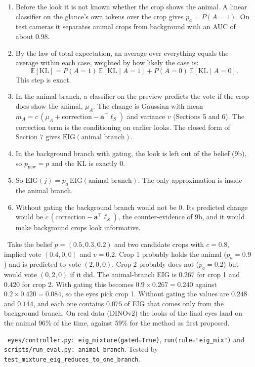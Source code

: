 \documentclass[11pt]{article}
\newcommand{\EIG}{\mathrm{EIG}}
\newcommand{\KL}{\mathrm{KL}}
\newcommand{\Steps}{\par\smallskip\noindent{\sffamily\bfseries\color{headblue}Steps.}\par}
\newcommand{\CheckNum}{\par\smallskip\noindent{\sffamily\bfseries\color{headblue}Check with numbers.}\ }
\newcommand{\Code}{\par\smallskip\noindent{\sffamily\bfseries\color{headblue}In the code.}\ }
\newenvironment{steps}{\begin{enumerate}[label=\textbf{\arabic*.},leftmargin=2em,itemsep=6pt]}{\end{enumerate}}
\begin{document}
\Steps
\begin{steps}
  \item Before the look it is not known whether the crop shows the animal. A linear classifier on the glance's own tokens over the crop gives $p_a=P(A=1)$. On test cameras it separates animal crops from background with an AUC of about 0.98.
  \item By the law of total expectation, an average over everything equals the average within each case, weighted by how likely the case is:
  \[ \mathbb E[\KL]=P(A{=}1)\,\mathbb E[\KL\mid A{=}1]+P(A{=}0)\,\mathbb E[\KL\mid A{=}0]. \]
  This step is exact.
  \item In the animal branch, a classifier on the preview predicts the vote if the crop does show the animal, $\mu_A$. The change is Gaussian with mean $m_A=c\,(\mu_A+\text{correction}-\bm a^\top\bm\ell_S)$ and variance $v$ (Sections 5 and 6). The correction term is the conditioning on earlier looks. The closed form of Section 7 gives $\EIG(\text{animal branch})$.
  \item In the background branch with gating, the look is left out of the belief (9b), so $p_{\text{new}}=p$ and the KL is exactly 0.
  \item So $\EIG(j)=p_a\,\EIG(\text{animal branch})$. The only approximation is inside the animal branch.
  \item Without gating the background branch would not be 0. Its predicted change would be $c\,(\text{correction}-\bm a^\top\bm\ell_S)$, the counter-evidence of 9b, and it would make background crops look informative.
\end{steps}

\CheckNum Take the belief $p=(0.5,0.3,0.2)$ and two candidate crops with $c=0.8$, implied vote $(0.4,0,0)$ and $v=0.2$. Crop 1 probably holds the animal ($p_a=0.9$) and is predicted to vote $(2,0,0)$. Crop 2 probably does not ($p_a=0.2$) but would vote $(0,2,0)$ if it did. The animal-branch EIG is $0.267$ for crop 1 and $0.420$ for crop 2. With gating this becomes $0.9\times0.267=0.240$ against $0.2\times0.420=0.084$, so the eyes pick crop 1. Without gating the values are $0.248$ and $0.144$, and each one contains $0.075$ of EIG that comes only from the background branch. On real data (DINOv2) the looks of the final eyes land on the animal 96\% of the time, against 59\% for the method as first proposed.

\Code \texttt{eyes/controller.py: eig\_\allowbreak{}mixture(gated=True)}, \texttt{run(rule="eig\_\allowbreak{}mix")} and \texttt{scripts/run\_\allowbreak{}eval.py: animal\_\allowbreak{}branch}. Tested by \texttt{test\_\allowbreak{}mixture\_\allowbreak{}eig\_\allowbreak{}reduces\_\allowbreak{}to\_\allowbreak{}one\_\allowbreak{}branch}.
\end{document}
